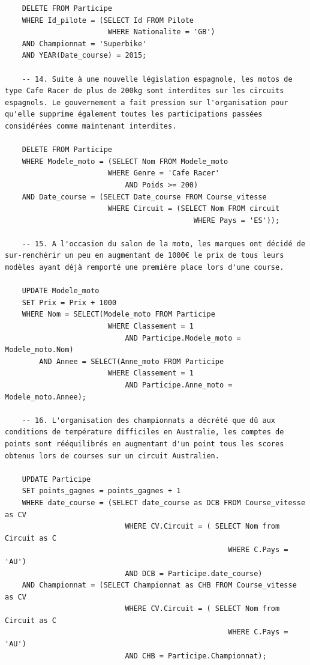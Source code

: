 \documentclass[12pt,a4paper]{article}
\newenvironment{code}{\captionsetup{type=listing}}{}
\begin{document}
\begin{code}
\begin{verbatim}
    DELETE FROM Participe
    WHERE Id_pilote = (SELECT Id FROM Pilote 
                        WHERE Nationalite = 'GB')
    AND Championnat = 'Superbike'
    AND YEAR(Date_course) = 2015;
    
    -- 14. Suite à une nouvelle législation espagnole, les motos de type Cafe Racer de plus de 200kg sont interdites sur les circuits espagnols. Le gouvernement a fait pression sur l'organisation pour qu'elle supprime également toutes les participations passées considérées comme maintenant interdites.
    
    DELETE FROM Participe
    WHERE Modele_moto = (SELECT Nom FROM Modele_moto 
                        WHERE Genre = 'Cafe Racer'
                            AND Poids >= 200)
    AND Date_course = (SELECT Date_course FROM Course_vitesse
                        WHERE Circuit = (SELECT Nom FROM circuit
                                            WHERE Pays = 'ES'));
                                            
    -- 15. A l'occasion du salon de la moto, les marques ont décidé de sur-renchérir un peu en augmentant de 1000€ le prix de tous leurs modèles ayant déjà remporté une première place lors d'une course.

    UPDATE Modele_moto
    SET Prix = Prix + 1000
    WHERE Nom = SELECT(Modele_moto FROM Participe
                        WHERE Classement = 1
                            AND Participe.Modele_moto = Modele_moto.Nom)
        AND Annee = SELECT(Anne_moto FROM Participe
                        WHERE Classement = 1
                            AND Participe.Anne_moto = Modele_moto.Annee);
                            
    -- 16. L'organisation des championnats a décrété que dû aux conditions de température difficiles en Australie, les comptes de points sont rééquilibrés en augmentant d'un point tous les scores obtenus lors de courses sur un circuit Australien.

    UPDATE Participe
    SET points_gagnes = points_gagnes + 1
    WHERE date_course = (SELECT date_course as DCB FROM Course_vitesse as CV
                            WHERE CV.Circuit = ( SELECT Nom from Circuit as C
                                                    WHERE C.Pays = 'AU') 
                            AND DCB = Participe.date_course)
    AND Championnat = (SELECT Championnat as CHB FROM Course_vitesse as CV
                            WHERE CV.Circuit = ( SELECT Nom from Circuit as C
                                                    WHERE C.Pays = 'AU') 
                            AND CHB = Participe.Championnat);
    

\end{verbatim}
\end{code}
\end{document}

